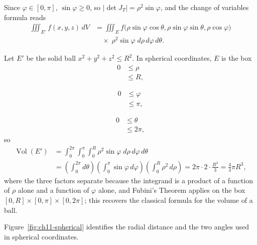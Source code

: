 Since $\varphi \in [0,\pi]$, $\sin\varphi \geq 0$, so $|\det J_T| = \rho^2\sin\varphi$, and the change of variables formula reads
\begin{align*}
\iiint_{E'} f(x,y,z)\, dV &= \iiint_E f\big(\rho\sin\varphi\cos\theta, \rho\sin\varphi\sin\theta, \rho\cos\varphi\big) \\
&\quad\times\; \rho^2\sin\varphi\; d\rho\, d\varphi\, d\theta.
\end{align*}

\begin{example}
Let $E'$ be the solid ball $x^2+y^2+z^2 \leq R^2$. In spherical coordinates, $E$ is the box
\[
\begin{aligned}
0 &\leq \rho \\
&\leq R,
\end{aligned}
\]

\[
\begin{aligned}
0 &\leq \varphi \\
&\leq \pi,
\end{aligned}
\]

\[
\begin{aligned}
0 &\leq \theta \\
&\leq 2\pi,
\end{aligned}
\]
so
\begin{align*}
\operatorname{Vol}(E') &= \int_0^{2\pi}\!\!\int_0^{\pi}\!\!\int_0^{R} \rho^2\sin\varphi \; d\rho\, d\varphi\, d\theta \\
&= \left(\int_0^{2\pi} d\theta\right)\left(\int_0^\pi \sin\varphi\, d\varphi\right)\left(\int_0^R \rho^2\, d\rho\right) = 2\pi \cdot 2 \cdot \frac{R^3}{3} = \frac{4}{3}\pi R^3,
\end{align*}
where the three factors separate because the integrand is a product of a function of $\rho$ alone and a function of $\varphi$ alone, and Fubini's Theorem applies on the box $[0,R]\times[0,\pi]\times[0,2\pi]$; this recovers the classical formula for the volume of a ball.
\end{example}

Figure~\ref{fig:ch11-spherical} identifies the radial distance and the two angles used in spherical coordinates.

